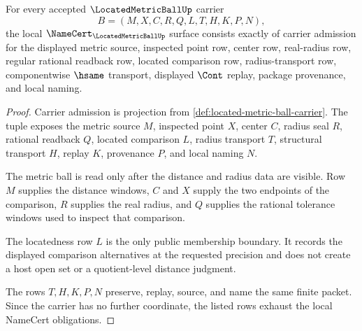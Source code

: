 \begin{theorem}
\label{thm:located-metric-ball-namecert-obligations}
For every accepted $\LocatedMetricBallUp$ carrier
$$
B=(M,X,C,R,Q,L,T,H,K,P,N),
$$
the local $\NameCert_{\LocatedMetricBallUp}$ surface consists exactly of carrier admission for the displayed metric source, inspected point row, center row, real-radius row, regular rational readback row, located comparison row, radius-transport row, componentwise $\hsame$ transport, displayed $\Cont$ replay, package provenance, and local naming.
\end{theorem}
\begin{proof}
Carrier admission is projection from \autoref{def:located-metric-ball-carrier}. The tuple exposes the metric source $M$, inspected point $X$, center $C$, radius seal $R$, rational readback $Q$, located comparison $L$, radius transport $T$, structural transport $H$, replay $K$, provenance $P$, and local naming $N$.

The metric ball is read only after the distance and radius data are visible. Row $M$ supplies the distance windows, $C$ and $X$ supply the two endpoints of the comparison, $R$ supplies the real radius, and $Q$ supplies the rational tolerance windows used to inspect that comparison.

The locatedness row $L$ is the only public membership boundary. It records the displayed comparison alternatives at the requested precision and does not create a host open set or a quotient-level distance judgment.

The rows $T,H,K,P,N$ preserve, replay, source, and name the same finite packet. Since the carrier has no further coordinate, the listed rows exhaust the local NameCert obligations.
\end{proof}

